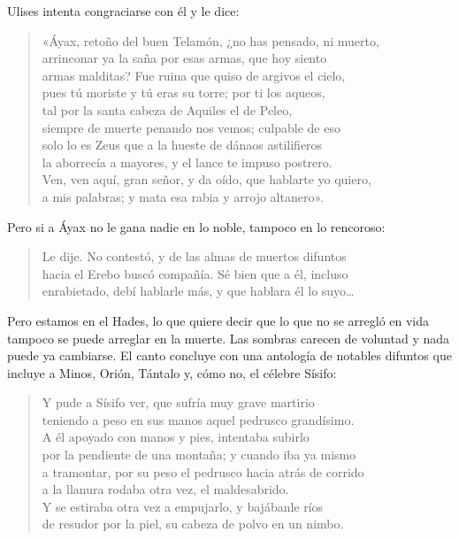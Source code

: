 Ulises intenta congraciarse con él y le dice:

\begin{verse}
«Áyax, retoño del buen Telamón, ¿no has pensado, ni muerto,\\
arrinconar ya la saña por esas armas, que hoy siento\\
armas malditas? Fue ruina que quiso de argivos el cielo,\\
pues tú moriste y tú eras su torre; por ti los aqueos,\\
tal por la santa cabeza de Aquiles el de Peleo,\\
siempre de muerte penando nos vemos; culpable de eso\\
solo lo es Zeus que a la hueste de dánaos astilifieros\\
la aborrecía a mayores, y el lance te impuso postrero.\\
Ven, ven aquí, gran señor, y da oído, que hablarte yo quiero,\\
a mis palabras; y mata esa rabia y arrojo altanero».
\end{verse}

Pero si a Áyax no le gana nadie en lo noble, tampoco en lo rencoroso:

\begin{verse}
Le dije. No contestó, y de las almas de muertos difuntos\\
hacia el Erebo buscó compañía. Sé bien que a él, incluso\\
enrabietado, debí hablarle más, y que hablara él lo suyo…
\end{verse}

Pero estamos en el Hades, lo que quiere decir que lo que no se arregló en vida tampoco se puede arreglar en la muerte. Las sombras carecen de voluntad y nada puede ya cambiarse. El canto concluye con una antología de notables difuntos que incluye a Minos, Orión, Tántalo y, cómo no, el célebre Sísifo:

\begin{verse}
Y pude a Sísifo ver, que sufría muy grave martirio\\
teniendo a peso en sus manos aquel pedrusco grandísimo.\\
A él apoyado con manos y pies, intentaba subirlo\\
por la pendiente de una montaña; y cuando iba ya mismo\\
a tramontar, por su peso el pedrusco hacia atrás de corrido\\
a la llanura rodaba otra vez, el maldesabrido.\\
Y se estiraba otra vez a empujarlo, y bajábanle ríos\\
de resudor por la piel, su cabeza de polvo en un nimbo.
\end{verse}

